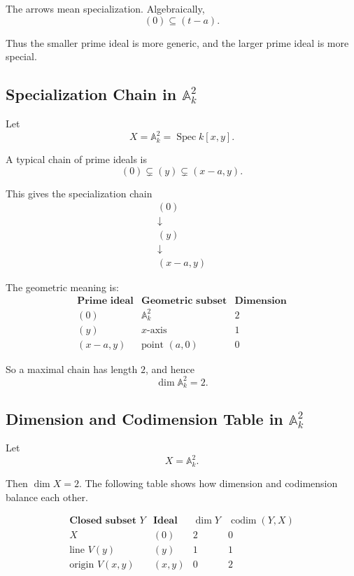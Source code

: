 \documentclass[12pt,a4paper]{article}
\theoremstyle{notespace}
\begin{document}
The arrows mean specialization. Algebraically,
\[
(0)\subseteq (t-a).
\]

Thus the smaller prime ideal is more generic, and the larger prime ideal is more special.

\subsection{Specialization Chain in \(\mathbb A^2_k\)}

Let
\[
X=\mathbb A^2_k=\operatorname{Spec} k[x,y].
\]

A typical chain of prime ideals is
\[
(0)\subsetneq (y)\subsetneq (x-a,y).
\]

This gives the specialization chain
\[
\begin{array}{c}
	(0)
	\\[0.5em]
	\downarrow
	\\[0.5em]
	(y)
	\\[0.5em]
	\downarrow
	\\[0.5em]
	(x-a,y)
\end{array}
\]

The geometric meaning is:
\[
\begin{array}{c|c|c}
	\textbf{Prime ideal} & \textbf{Geometric subset} & \textbf{Dimension} \\
	\hline
	(0) & \mathbb A^2_k & 2 \\
	(y) & x\text{-axis} & 1 \\
	(x-a,y) & \text{point }(a,0) & 0
\end{array}
\]

So a maximal chain has length \(2\), and hence
\[
\dim \mathbb A^2_k=2.
\]

\subsection{Dimension and Codimension Table in \(\mathbb A^2_k\)}

Let
\[
X=\mathbb A^2_k.
\]

Then \(\dim X=2\). The following table shows how dimension and codimension balance each other.

\[
\begin{array}{c|c|c|c}
	\textbf{Closed subset }Y
	&
	\textbf{Ideal}
	&
	\dim Y
	&
	\operatorname{codim}(Y,X)
	\\
	\hline
	X
	&
	(0)
	&
	2
	&
	0
	\\
	\text{line }V(y)
	&
	(y)
	&
	1
	&
	1
	\\
	\text{origin }V(x,y)
	&
	(x,y)
	&
	0
	&
	2
\end{array}
\]
\end{document}
